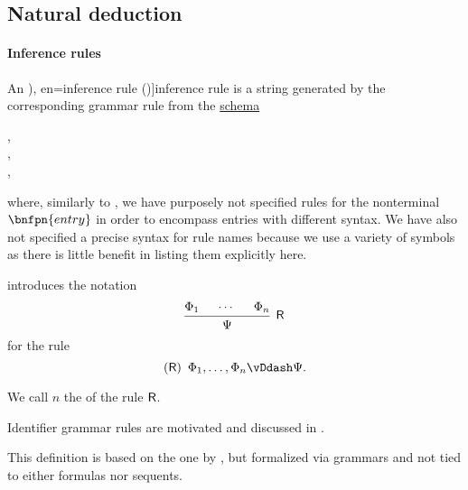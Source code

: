\subsection{Natural deduction}\label{subsec:natural_deduction}

\paragraph{Inference rules}

\begin{definition}\label{def:inference_rule}\mimprovised
  An \term[ru=правило вывода (\cite[31]{Герасимов2011}), en=inference rule (\cite[2]{MartinLof1996Meanings})]{inference rule} is a string generated by the corresponding grammar rule from the \hyperref[def:formal_grammar/schema]{schema}
  \begin{bnf*}
         { \bnfor {} \bnfsp \bnftsq{,} \bnfsp {}}, \\
           {\bnfes \bnfor {} \bnfor {}}, \\
         {}, \\
     {\bnftsq{(} \bnfsp {} \bnfsp \bnftsq{)} \bnfsp {} \bnfsp \bnftsq{\( \vDdash \)} \bnfsp {}}
  \end{bnf*}
  where, similarly to , we have purposely not specified rules for the nonterminal \( \bnfpn{entry} \) in order to encompass entries with different syntax. We have also not specified a precise syntax for rule names because we use a variety of symbols as there is little benefit in listing them explicitly here.

   introduces the notation
  \begin{equation*}
    \begin{prooftree}
      \hypo{ \Phi_1 }
      \hypo{ \cdots }
      \hypo{ \Phi_n }
      \infer3[\logic{R}]{ \Psi }
    \end{prooftree}
  \end{equation*}
  for the rule
  \begin{equation*}
    (\logic{R}) \enspace \Phi_1, \ldots, \Phi_n \vDdash \Psi.
  \end{equation*}

  We call \( n \) the  of the rule \( \textsf{R} \).
\end{definition}
\begin{comments}
  \item Identifier grammar rules are motivated and discussed in .
  \item This definition is based on the one by , but formalized via grammars and not tied to either formulas nor sequents.
\end{comments}

